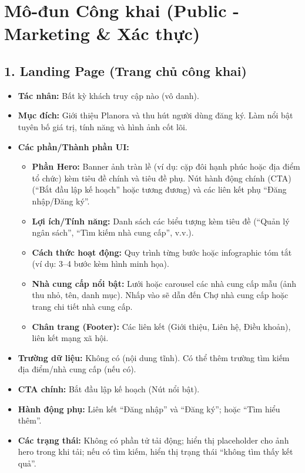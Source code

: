 \documentclass[11pt,a4paper]{article}
\begin{document}
\section{Mô-đun Công khai (Public - Marketing \& Xác thực)}

\subsection{1. Landing Page (Trang chủ công khai)}
\begin{itemize}
    \item \textbf{Tác nhân:} Bất kỳ khách truy cập nào (vô danh).
    \item \textbf{Mục đích:} Giới thiệu Planora và thu hút người dùng đăng ký. Làm nổi bật tuyên bố giá trị, tính năng và hình ảnh cốt lõi.
    \item \textbf{Các phần/Thành phần UI:}
    \begin{itemize}
        \item \textbf{Phần Hero:} Banner ảnh tràn lề (ví dụ: cặp đôi hạnh phúc hoặc địa điểm tổ chức) kèm tiêu đề chính và tiêu đề phụ. Nút hành động chính (CTA) (``Bắt đầu lập kế hoạch'' hoặc tương đương) và các liên kết phụ ``Đăng nhập/Đăng ký''.
        \item \textbf{Lợi ích/Tính năng:} Danh sách các biểu tượng kèm tiêu đề (``Quản lý ngân sách'', ``Tìm kiếm nhà cung cấp'', v.v.).
        \item \textbf{Cách thức hoạt động:} Quy trình từng bước hoặc infographic tóm tắt (ví dụ: 3–4 bước kèm hình minh họa).
        \item \textbf{Nhà cung cấp nổi bật:} Lưới hoặc carousel các nhà cung cấp mẫu (ảnh thu nhỏ, tên, danh mục). Nhấp vào sẽ dẫn đến Chợ nhà cung cấp hoặc trang chi tiết nhà cung cấp.
        \item \textbf{Chân trang (Footer):} Các liên kết (Giới thiệu, Liên hệ, Điều khoản), liên kết mạng xã hội.
    \end{itemize}
    \item \textbf{Trường dữ liệu:} Không có (nội dung tĩnh). Có thể thêm trường tìm kiếm địa điểm/nhà cung cấp (nếu có).
    \item \textbf{CTA chính:} Bắt đầu lập kế hoạch (Nút nổi bật).
    \item \textbf{Hành động phụ:} Liên kết ``Đăng nhập'' và ``Đăng ký''; hoặc ``Tìm hiểu thêm''.
    \item \textbf{Các trạng thái:} Không có phần tử tải động; hiển thị placeholder cho ảnh hero trong khi tải; nếu có tìm kiếm, hiển thị trạng thái ``không tìm thấy kết quả''.

\end{itemize}
\end{document}

